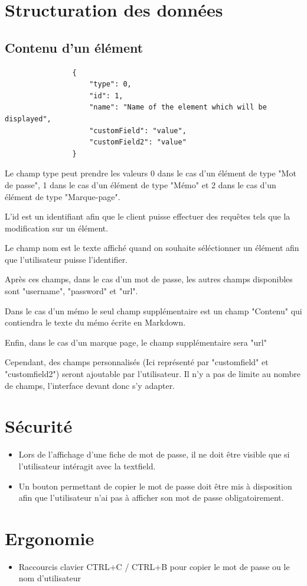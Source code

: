 \documentclass[oneside]{report}
\begin{document}
	\section{Structuration des données}{
		\subsection{Contenu d'un élément} {
			\vspace{1cm}
			\begin{lstlisting}
				{
					"type": 0,
					"id": 1,
					"name": "Name of the element which will be displayed",
					"customField": "value",
					"customField2": "value"
				}
			\end{lstlisting}
			\vspace{1cm}
			\par Le champ type peut prendre les valeurs 0 dans le cas d'un élément de type "Mot de passe", 1 dans le cas d'un élément de type "Mémo" et 2 dans le cas d'un élément de type "Marque-page".
			\par L'id est un identifiant afin que le client puisse effectuer des requêtes tels que la modification sur un élément.
			\par Le champ nom est le texte affiché quand on souhaite séléctionner un élément afin que l'utilisateur puisse l'identifier.
			\par Après ces champs, dans le cas d'un mot de passe, les autres champs disponibles sont "username", "password" et "url".
			\par Dans le cas d'un mémo le seul champ supplémentaire est un champ "Contenu" qui contiendra le texte du mémo écrite en Markdown.
			\par Enfin, dans le cas d'un marque page, le champ supplémentaire sera "url"
			\par Cependant, des champs personnalisés (Ici représenté par "customfield" et "customfield2") seront ajoutable par l'utilisateur. Il n'y a pas de limite au nombre de champs, l'interface devant donc s'y adapter.
		}
	}
	\section{Sécurité}{
		\begin{itemize}
			\item Lors de l'affichage d'une fiche de mot de passe, il ne doit être visible que si l'utilisateur intéragit avec la textfield.
			\item Un bouton permettant de copier le mot de passe doit être mis à disposition afin que l'utilisateur n'ai pas à afficher son mot de passe obligatoirement.
		\end{itemize}
	}

	\section{Ergonomie}{
		\begin{itemize}
			\item Raccourcis clavier CTRL+C / CTRL+B pour copier le mot de passe ou le nom d'utilisateur
		\end{itemize}
	}
\end{document}
